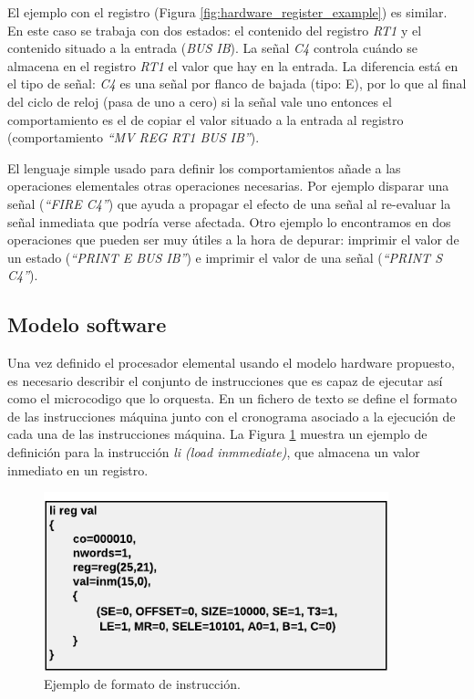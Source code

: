 El ejemplo con el registro (Figura \ref{fig:hardware_register_example}) es similar. En este caso se trabaja con dos estados: el contenido del registro \emph{RT1} y el contenido situado a la entrada (\emph{BUS IB}). La señal \emph{C4} controla cuándo se almacena en el registro \emph{RT1} el valor que hay en la entrada. La diferencia está en el tipo de señal: \emph{C4} es una señal por flanco de bajada (tipo: E), por lo que al final del ciclo de reloj (pasa de uno a cero) si la señal vale uno entonces el comportamiento es el de copiar el valor situado a la entrada al registro (comportamiento \emph{``MV REG RT1 BUS IB''}).

El lenguaje simple usado para definir los comportamientos añade a las operaciones elementales otras operaciones necesarias. Por ejemplo disparar una señal (\emph{``FIRE C4''}) que ayuda a propagar el efecto de una señal al re-evaluar la señal inmediata que podría verse afectada. Otro ejemplo lo encontramos en dos operaciones que pueden ser muy útiles a la hora de depurar: imprimir el valor de un estado (\emph{``PRINT E BUS IB''}) e imprimir el valor de una señal (\emph{``PRINT S C4''}).

\subsection{Modelo \gls{software}}

Una vez definido el procesador elemental usando el modelo \gls{hardware} propuesto, es necesario describir el conjunto de instrucciones que es capaz de ejecutar así como el \gls{microcodigo} que lo orquesta. En un fichero de texto se define el formato de las instrucciones máquina junto con el cronograma asociado a la ejecución de cada una de las instrucciones máquina. La Figura \ref{fig:software_format_example} muestra un ejemplo de definición para la instrucción \emph{li (load inmmediate)}, que almacena un valor inmediato en un registro.

\begin{figure}[htbp]
 	\centering
 	\includegraphics[width=10cm]{figures/instruction_example}
 	\caption{Ejemplo de formato de instrucción.}
	\label{fig:software_format_example}
\end{figure}

